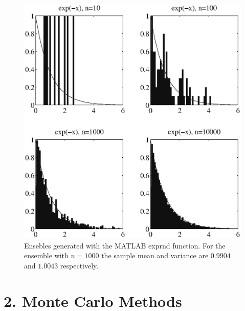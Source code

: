 \documentclass[fleqn, letterpaper]{tufte-handout}
\begin{document}
\begin{figure}
        \includegraphics[width=\textwidth]{problem1e}
        \caption{Ensebles generated with the MATLAB {\ttfamily exprnd} function.
        For the ensemble with $n=1000$ the sample mean and variance are $0.9904$ and $1.0043$ respectively.}
        \label{exprnd}
\end{figure}
\small
\begin{minipage}{\linewidth}
        
\end{minipage}

\section{2. Monte Carlo Methods}
\end{document}
